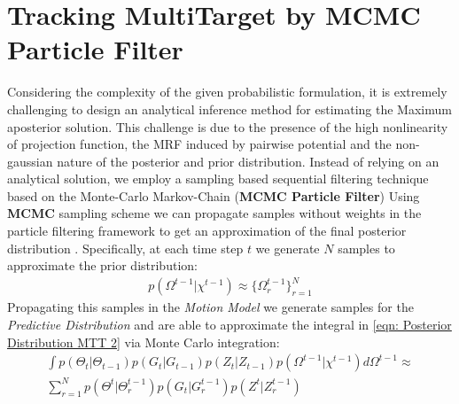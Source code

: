 \section{Tracking MultiTarget by MCMC Particle Filter}
Considering the complexity of the given probabilistic formulation, it is extremely
challenging to design an analytical inference method for estimating the Maximum aposterior solution. This challenge is due to the presence of the high nonlinearity of projection function, the MRF induced by pairwise potential and the non-gaussian nature of the posterior and prior distribution. 
Instead of relying on an analytical solution, we employ a sampling based sequential filtering technique based on the Monte-Carlo Markov-Chain (\textbf{MCMC Particle Filter})
Using \textbf{MCMC} sampling scheme we can propagate samples without weights in the particle filtering framework to get an approximation of the final posterior distribution .
Specifically, at each time step $t$ we generate $N$ samples to approximate the prior distribution:
\begin{eqnarray} \label{eqn: Predictive Approximation}
p(\Omega^{t-1} |\chi^{t-1}) \approx \{ \Omega_r^{t-1} \}_{r=1}^N
\end{eqnarray}
Propagating this samples in the \textit{Motion Model} we generate samples for the \textit{Predictive Distribution} and are able to approximate the integral in \ref{eqn: Posterior Distribution MTT 2} via Monte Carlo integration:\\
\begin{eqnarray} \label{eqn: MonteCarlo Approx. Predictive}	
\int p(\Theta_{t} |\Theta_{t-1}) p(G_t |G_{t−1}) p(Z_t |Z_{t−1})p(\Omega^{t-1}|\chi^{t-1}) d\Omega^{t-1} \approx \\ \nonumber
\sum_{r=1}^{N} p(\Theta^{t} | \Theta^{t-1}_r) p(G_t |G^{t-1}_r) p(Z^t |Z^{t-1}_r) 
\end{eqnarray}

